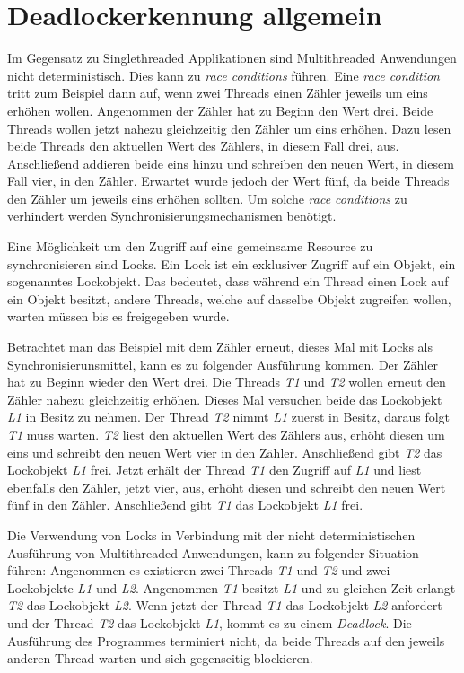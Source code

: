 \section{Deadlockerkennung allgemein}
\label{section:Deadlockerkennung allgemein}
Im Gegensatz zu Singlethreaded Applikationen sind Multithreaded Anwendungen
nicht deterministisch. Dies kann zu \textit{race conditions} führen. Eine
\textit{race condition} tritt zum Beispiel dann auf, wenn zwei Threads einen
Zähler jeweils um eins erhöhen wollen. Angenommen der Zähler hat zu Beginn den
Wert drei. Beide Threads wollen jetzt nahezu gleichzeitig den Zähler um eins
erhöhen. Dazu lesen beide Threads den aktuellen Wert des Zählers, in diesem Fall
drei, aus. Anschließend addieren beide eins hinzu und schreiben den neuen Wert,
in diesem Fall vier, in den Zähler. Erwartet wurde jedoch der Wert fünf, da
beide Threads den Zähler um jeweils eins erhöhen sollten. Um solche
\textit{race conditions} zu verhindert werden Synchronisierungsmechanismen
benötigt.

Eine Möglichkeit um den Zugriff auf eine gemeinsame Resource zu synchronisieren
sind Locks. Ein Lock ist ein exklusiver Zugriff auf ein Objekt, ein sogenanntes
Lockobjekt. Das bedeutet, dass während ein Thread einen Lock auf ein Objekt
besitzt, andere Threads, welche auf dasselbe Objekt zugreifen wollen, warten
müssen bis es freigegeben wurde.

Betrachtet man das Beispiel mit dem Zähler erneut, dieses Mal mit Locks als
Synchronisierunsmittel, kann es zu folgender Ausführung kommen. Der Zähler hat
zu Beginn wieder den Wert drei. Die Threads \textit{T1} und \textit{T2} wollen
erneut den Zähler nahezu gleichzeitig erhöhen. Dieses Mal versuchen beide das
Lockobjekt \textit{L1} in Besitz zu nehmen. Der Thread \textit{T2} nimmt
\textit{L1} zuerst in Besitz, daraus folgt \textit{T1} muss warten. \textit{T2}
liest den aktuellen Wert des Zählers aus, erhöht diesen um eins und schreibt den
neuen Wert vier in den Zähler. Anschließend gibt \textit{T2} das Lockobjekt
\textit{L1} frei. Jetzt erhält der Thread \textit{T1} den Zugriff auf
\textit{L1} und liest ebenfalls den Zähler, jetzt vier, aus, erhöht diesen und
schreibt den neuen Wert fünf in den Zähler. Anschließend gibt \textit{T1} das
Lockobjekt \textit{L1} frei.

Die Verwendung von Locks in Verbindung mit der nicht deterministischen
Ausführung von Multithreaded Anwendungen, kann zu folgender Situation führen:
Angenommen es existieren zwei Threads \textit{T1} und \textit{T2} und zwei
Lockobjekte \textit{L1} und \textit{L2}. Angenommen \textit{T1} besitzt
\textit{L1} und zu gleichen Zeit erlangt \textit{T2} das Lockobjekt \textit{L2}.
Wenn jetzt der Thread \textit{T1} das Lockobjekt \textit{L2} anfordert und der
Thread \textit{T2} das Lockobjekt \textit{L1}, kommt es zu einem
\textit{Deadlock}. Die Ausführung des Programmes terminiert nicht, da beide
Threads auf den jeweils anderen Thread warten und sich gegenseitig
blockieren.

